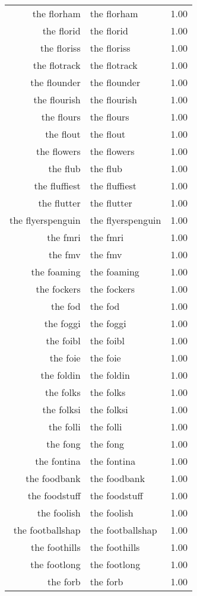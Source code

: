 \begin{table}[ht]
\begin{tabular}{rlr}
  the florham & the florham & 1.00 \\ 
  the florid & the florid & 1.00 \\ 
  the floriss & the floriss & 1.00 \\ 
  the flotrack & the flotrack & 1.00 \\ 
  the flounder & the flounder & 1.00 \\ 
  the flourish & the flourish & 1.00 \\ 
  the flours & the flours & 1.00 \\ 
  the flout & the flout & 1.00 \\ 
  the flowers & the flowers & 1.00 \\ 
  the flub & the flub & 1.00 \\ 
  the fluffiest & the fluffiest & 1.00 \\ 
  the flutter & the flutter & 1.00 \\ 
  the flyerspenguin & the flyerspenguin & 1.00 \\ 
  the fmri & the fmri & 1.00 \\ 
  the fmv & the fmv & 1.00 \\ 
  the foaming & the foaming & 1.00 \\ 
  the fockers & the fockers & 1.00 \\ 
  the fod & the fod & 1.00 \\ 
  the foggi & the foggi & 1.00 \\ 
  the foibl & the foibl & 1.00 \\ 
  the foie & the foie & 1.00 \\ 
  the foldin & the foldin & 1.00 \\ 
  the folks & the folks & 1.00 \\ 
  the folksi & the folksi & 1.00 \\ 
  the folli & the folli & 1.00 \\ 
  the fong & the fong & 1.00 \\ 
  the fontina & the fontina & 1.00 \\ 
  the foodbank & the foodbank & 1.00 \\ 
  the foodstuff & the foodstuff & 1.00 \\ 
  the foolish & the foolish & 1.00 \\ 
  the footballshap & the footballshap & 1.00 \\ 
  the foothills & the foothills & 1.00 \\ 
  the footlong & the footlong & 1.00 \\ 
  the forb & the forb & 1.00 \\ 

\end{tabular}
\end{table}
